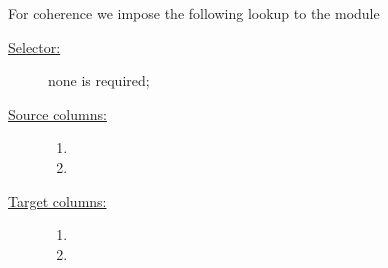 For coherence we impose the following lookup to the \hashDataMod{} module 
\begin{description}
	\item[\underline{Selector:}] none is required;
	\item[\underline{Source columns:}]
		\begin{multicols}{2}
			\begin{enumerate}
				\item \hashInfoStamp
				\item \hashInfoSize
			\end{enumerate}
		\end{multicols}
	\item[\underline{Target columns:}]
		\begin{multicols}{2}
			\begin{enumerate}
				\item \hashDataStamp
				\item \hashInfoSize
			\end{enumerate}
		\end{multicols}
\end{description}
